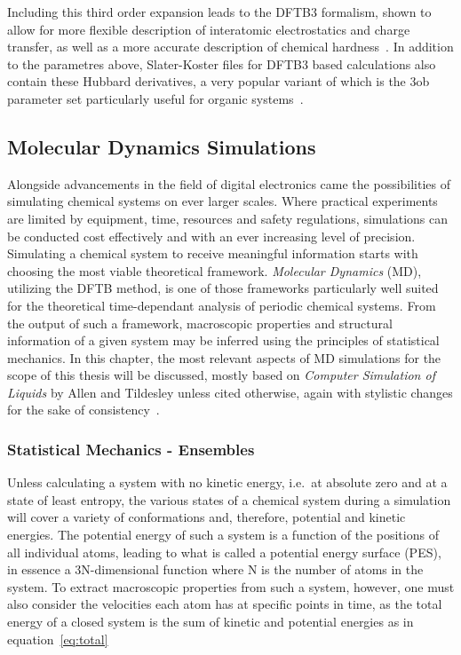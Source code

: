 \documentclass[11pt]{article}
\begin{document}
\bigskip 

\noindent Including this third order expansion leads to the DFTB3 formalism, shown to allow for more flexible description of interatomic electrostatics and charge transfer, as well as a more accurate description of chemical hardness~\cite{yangsource}. In addition to the parametres above, Slater-Koster files for DFTB3 based calculations also contain these Hubbard derivatives, a very popular variant of which is the 3ob parameter set particularly useful for organic systems~\cite{Gaus2012}.

\subsection{Molecular Dynamics Simulations}
Alongside advancements in the field of digital electronics came the possibilities of simulating chemical 
systems on ever larger scales. Where practical experiments are limited by equipment, time, resources and safety regulations, 
simulations can be conducted cost effectively and with an ever increasing level of precision.
Simulating a chemical system to receive meaningful information starts with choosing the most viable
theoretical framework. \textit{Molecular Dynamics} (MD), utilizing the DFTB method, is one of those frameworks particularly well suited for  the theoretical time-dependant analysis of periodic chemical systems. From the output of such a framework, macroscopic properties and structural information of a given system may be inferred using the principles of statistical mechanics.
In this chapter, the most relevant aspects of MD simulations for the scope of this thesis will be discussed, mostly based on \textit{Computer Simulation of Liquids} by Allen and Tildesley unless cited otherwise, again with stylistic changes for the sake of consistency~\cite{Allen2017}.

\subsubsection{Statistical Mechanics - Ensembles}
Unless calculating a system with no kinetic energy, i.e.~at absolute zero and at a state of least entropy, the various states of a chemical system during a simulation will cover a variety of conformations and, therefore, potential and kinetic energies. The potential energy of such a system is a function of the positions of all individual atoms, leading to what is called a potential energy surface (PES), in essence a 3N-dimensional function where N is the number of atoms in the system. To extract macroscopic properties from such a system, however, one must also consider the velocities each atom has at specific points in time, as the total energy of a closed system is the sum of kinetic and potential energies as in equation~\ref{eq:total}
\end{document}
